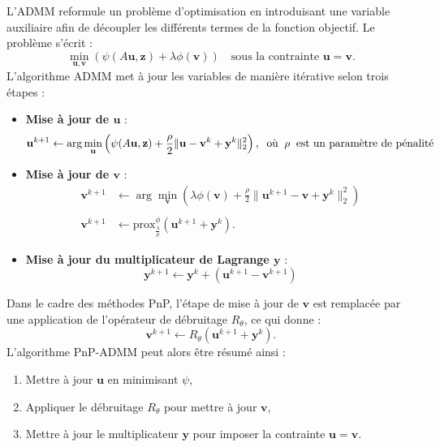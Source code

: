 \documentclass[a4paper, 12pt]{report} %
\begin{document}
L’ADMM reformule un problème d’optimisation en introduisant une variable auxiliaire afin de découpler les différents termes de la fonction objectif. Le problème s’écrit :
\[
\min_{\mathbf{u}, \mathbf{v}} \left( \psi(A\mathbf{u}, \mathbf{z}) + \lambda \phi(\mathbf{v}) \right) \quad \text{sous la contrainte } \mathbf{u} = \mathbf{v}.
\]
L’algorithme ADMM met à jour les variables de manière itérative selon trois étapes :
\begin{itemize}
    \item \textbf{Mise à jour de \( \mathbf{u} \)} :
    \[
    \mathbf{u}^{k+1} \leftarrow \arg\min_{\mathbf{u}} \left( \psi(A\mathbf{u}, \mathbf{z}) + \frac{\rho}{2} \| \mathbf{u} - \mathbf{v}^k + \mathbf{y}^k \|_2^2 \right), \hspace{0.2 cm} \text{où} \hspace{0.2 cm}  \rho \hspace{0.2 cm} \text{est un paramètre de pénalité}
    \]
    \item \textbf{Mise à jour de \( \mathbf{v} \)} :
     \begin{align*}
    \mathbf{v}^{k+1} &\leftarrow \arg\min_{\mathbf{v}} \left( \lambda \phi(\mathbf{v}) + \frac{\rho}{2} \| \mathbf{u}^{k+1} - \mathbf{v} + \mathbf{y}^k \|_2^2 \right) \\\\
    \mathbf{v}^{k+1} &\leftarrow  \text{prox}_{\frac{\lambda}{\rho}}^{\phi}( \mathbf{u}^{k+1} + \mathbf{y}^k). 
     \end{align*}
    \item \textbf{Mise à jour du multiplicateur de Lagrange \( \mathbf{y} \)} :
    \[
    \mathbf{y}^{k+1} \leftarrow \mathbf{y}^k + (\mathbf{u}^{k+1} - \mathbf{v}^{k+1})
    \]
\end{itemize}
Dans le cadre des méthodes PnP, l’étape de mise à jour de \( \mathbf{v} \) est remplacée par une application de l’opérateur de débruitage \( R_\theta \), ce qui donne :
\[
\mathbf{v}^{k+1} \leftarrow R_\theta(\mathbf{u}^{k+1} + \mathbf{y}^k).
\]
L’algorithme PnP-ADMM peut alors être résumé ainsi :
\begin{enumerate}
    \item Mettre à jour \( \mathbf{u} \) en minimisant \( \psi \),
    \item Appliquer le débruitage \( R_\theta \) pour mettre à jour \( \mathbf{v} \),
    \item Mettre à jour le multiplicateur \( \mathbf{y} \) pour imposer la contrainte \( \mathbf{u} = \mathbf{v} \).
\end{enumerate}
\end{document}
